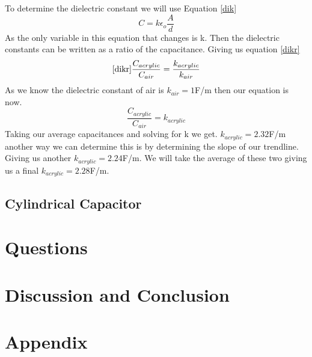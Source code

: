 \documentclass[10pt]{article}
\begin{document}
To determine the dielectric constant we will use Equation \ref*{dik}
\begin{equation}\label{dik}
  C = k\epsilon_{o}\frac{A}{d}
\end{equation}
As the only variable in this equation that changes is k. Then the dielectric constants
can be written as a ratio of the capacitance. Giving us equation \ref*{dikr}
\begin{equation}\ref*{dikr}
  \frac{C_{acrylic}}{C_{air}} = \frac{k_{acrylic}}{k_{air}}
\end{equation}
As we know the dielectric constant of air is $k_{air} = 1$F/m then our equation is now.\\
\begin{equation}
  \frac{C_{acrylic}}{C_{air}} = k_{acrylic}
\end{equation}
Taking our average capacitances and solving for k we get. $k_{acrylic} = 2.32$F/m another way
we can determine this is by determining the slope of our trendline. Giving us another $k_{acrylic} = 2.24$F/m.
We will take the average of these two giving us a final $k_{acrylic} = 2.28$F/m.\\
\subsection*{Cylindrical Capacitor}






\section{Questions}

\section{Discussion and Conclusion}


\section*{Appendix}\newpage



\end{document}

